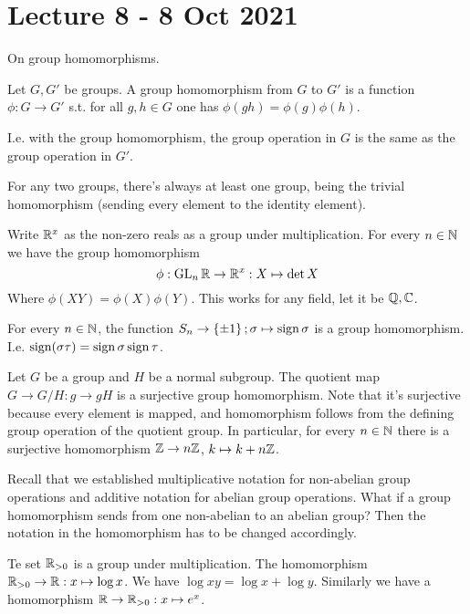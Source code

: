 \section{Lecture 8 - 8 Oct 2021}
On group homomorphisms. 
\begin{definition}
  Let $G,G'$ be groups. A group homomorphism from $G$ to $G'$ is a function $\phi:G\to G'$
  s.t. for all $g,h\in G$ one has $\phi(gh)=\phi(g) \phi(h)$.
  \label{groupHomomorphism}
\end{definition}
I.e. with the group homomorphism, the group operation in $G$ is the same as the group
operation in $G'$.

\begin{example}
  For any two groups, there's always at least one group, being the trivial homomorphism
  (sending every element to the identity element).
\end{example}

\begin{example}
  Write $\mathbb R^x$ as the non-zero reals as a group under multiplication. For every $n\in\mathbb N$
  we have the group homomorphism
  \[ \phi: \operatorname{GL}_n \mathbb R \to \mathbb R^x:X\mapsto \det X\]
  Where $\phi(XY)=\phi(X)\phi(Y)$. This works for any field, let it be $\mathbb Q,\mathbb C$.
\end{example}

\begin{example}
  For every $n\in\mathbb N$, the function $S_n\to \left\{ \pm 1 \right\}; \sigma\mapsto
  \operatorname{sign}\sigma$ is a group homomorphism. I.e. $\operatorname{sign} (\sigma\tau) = \operatorname{sign} \sigma \operatorname{sign}
  \tau$.
\end{example}

\begin{example}
  Let $G$ be a group and $H$ be a normal subgroup. The quotient map $G\to G/H : g\to gH$
  is a surjective group homomorphism. Note that it's surjective because every element is
  mapped, and homomorphism follows from the defining group operation of the quotient
  group. In particular, for every $n\in\mathbb N$ there is a surjective homomorphism $\mathbb Z\to
  n\mathbb Z$, $k\mapsto k+n\mathbb Z$.
\end{example}

Recall that we established multiplicative notation for non-abelian group operations and
additive notation for abelian group operations. What if a group homomorphism sends from
one non-abelian to an abelian group? Then the notation in the homomorphism has to be
changed accordingly.
\begin{example}
  Te set $\mathbb R_{>0}$ is a group under multiplication. The homomorphism $\mathbb R_{>0}\to
  \mathbb R:x\mapsto \log x$. We have $\log xy = \log x + \log y$. Similarly we have a
  homomorphism $\mathbb R\to\mathbb R_{>0} : x\mapsto e^{x}$.
\end{example}


